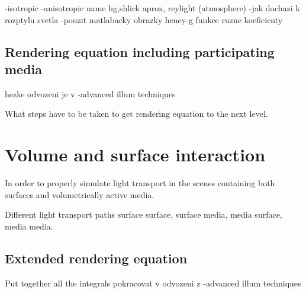 -isotropic
-anisotropic name hg,shlick aprox, reylight (atmosphere)
-jak dochazi k rozptylu svetla
-pouzit matlabacky obrazky heney-g funkce ruzne koeficienty

\subsection{Rendering equation including participating media}
hezke odvozeni je v -advanced illum techniques

What steps have to be taken to get rendering equation to the next level.

\section{Volume and surface interaction}
In order to properly simulate light transport in the scenes containing both surfaces and volumetrically active media.

Different light transport paths surface surface, surface media, media surface, media media.

\subsection{Extended rendering equation}
Put together all the integrals
pokracovat v odvozeni z -advanced illum techniques





